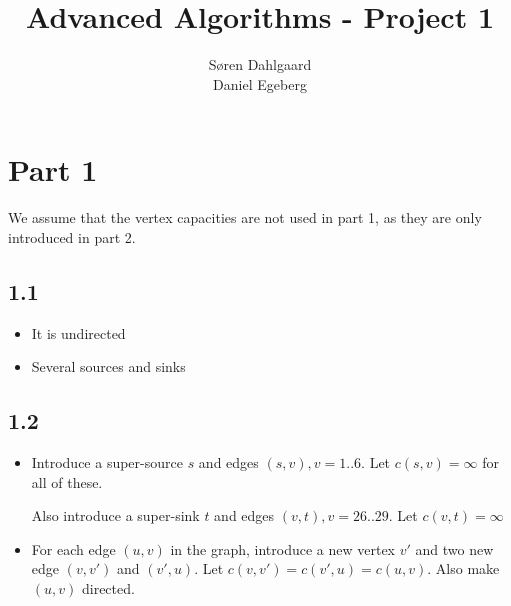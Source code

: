 \documentclass{sig-alternate}
\begin{document}
\title{Advanced Algorithms - Project 1}


\author{
\alignauthor
Søren Dahlgaard\\
\alignauthor
Daniel Egeberg\\
}

\maketitle

\begin{abstract}
\end{abstract}

\section{Part 1}
We assume that the vertex capacities are not used in part 1, as they are only
introduced in part 2.

\subsection{1.1}
\begin{itemize}
\item It is undirected
\item Several sources and sinks
\end{itemize}

\subsection{1.2}
\begin{itemize}
\item Introduce a super-source $s$ and edges $(s, v), v = 1..6$. Let
    $c(s,v) = \infty$ for all of these.

    Also introduce a super-sink $t$ and edges $(v, t), v = 26..29$. Let
    $c(v, t) = \infty$
\item For each edge $(u,v)$ in the graph, introduce a new vertex $v'$ and two
    new edge $(v, v')$ and $(v', u)$. Let $c(v, v') = c(v', u) = c(u, v)$.
    Also make $(u,v)$ directed.
\end{itemize}
\end{document}
